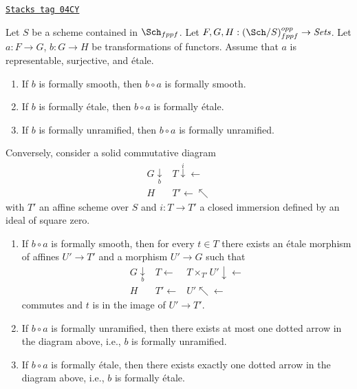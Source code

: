 \begin{lemma}
\label{spaces-more-morphisms-lemma-etale-on-top}
\href{https://stacks.math.columbia.edu/tag/04CY}{\texttt{Stacks tag 04CY}}

Let $S$ be a scheme contained in $\Sch_{fppf}$.
Let $F, G, H : (\Sch/S)_{fppf}^{opp} \to \textit{Sets}$.
Let $a : F \to G$, $b : G \to H$ be transformations of functors.
Assume that $a$ is representable, surjective, and \'etale.
\begin{enumerate}
\item If $b$ is formally smooth, then $b \circ a$ is formally smooth.
\item If $b$ is formally \'etale, then $b \circ a$ is formally \'etale.
\item If $b$ is formally unramified, then $b \circ a$ is formally unramified.
\end{enumerate}
Conversely, consider a solid commutative diagram
$$
\begin{array}{cc}G \underset{b}{\downarrow} & T \overset{i}{\downarrow}\longleftarrow \\ H & T' \longleftarrow\nwarrow\end{array}
$$
with $T'$ an affine scheme over $S$
and $i : T \to T'$ a closed immersion defined by an ideal of square zero.
\begin{enumerate}
\item[(4)] If $b \circ a$ is formally smooth, then for every $t \in T$
there exists an \'etale morphism of affines $U' \to T'$ and a morphism
$U' \to G$ such that
$$
\begin{array}{ccc}G \underset{b}{\downarrow} & T \longleftarrow & T \times_{T'} U' \downarrow\longleftarrow \\ H & T' \longleftarrow & U' \nwarrow\longleftarrow\end{array}
$$
commutes and $t$ is in the image of $U' \to T'$.
\item[(5)] If $b \circ a$ is formally unramified, then there exists at most
one dotted arrow in the diagram above, i.e., $b$ is formally unramified.
\item[(6)] If $b \circ a$ is formally \'etale, then there exists exactly one
dotted arrow in the diagram above, i.e., $b$ is formally \'etale.
\end{enumerate}
\end{lemma}

